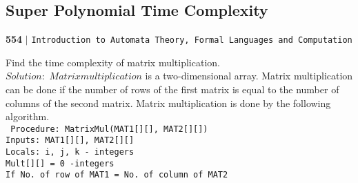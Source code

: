 \documentclass[9pt]{beamer}
\begin{document}
\begin{frame}
\section*{Super Polynomial Time Complexity}
\begin{flushleft}
    \textbf{554}\hspace*{0.1cm} \textbf{$|$} \hspace*{0.1cm} \texttt{Introduction to Automata Theory, Formal Languages and Computation}
  \end{flushleft}

\vspace*{0.5cm}
\hspace*{0.1cm} Find the time complexity of matrix multiplication.\\

\textbf{$Solution:$} $Matrix multiplication$ is a two-dimensional array. Matrix multiplication can be done if the
number of rows of the first matrix is equal to the number of columns of the second matrix. Matrix
multiplication is done by the following algorithm.\\

\texttt{
\hspace*{1.5cm} Procedure: MatrixMul(MAT1[][], MAT2[][])\\
\hspace*{1.5cm} Inputs: MAT1[][], MAT2[][] \\
\hspace*{2cm} Locals: i, j, k - integers \\
\hspace*{2cm} Mult[][] = 0 -integers \\
\hspace*{2cm} If No. of row of MAT1 = No. of column of MAT2 \\
}

\end{frame}
\end{document}
